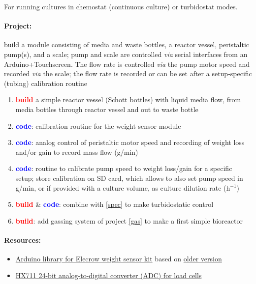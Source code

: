 \documentclass[12pt,a4paper]{scrartcl}
\newcommand{\build}[0]{\textcolor{red}{\textbf{build}}}
\newcommand{\code}[0]{\textcolor{blue}{\textbf{code}}}
\newcommand{\ph}[0]{h{\small$^{-1}$}}
\begin{document}
For running cultures in chemostat (continuous culture) or turbidostat modes. 

\paragraph{Project:} build a module consisting of media and waste bottles, 
a reactor vessel, peristaltic pump(s), and a scale; pump and scale are
controlled \textit{via} serial interfaces from an
Arduino+Touchscreen. The flow rate is controlled \textit{via} the pump
motor speed and recorded \textit{via} the scale; the flow rate is
recorded or can be set after a setup-specific (tubing) calibration
routine


\begin{enumerate}
\item \build{} a simple reactor vessel (Schott bottles) with liquid
  media flow, from media bottles through reactor vessel and out to
  waste bottle 
\item \code{}: calibration routine for the weight sensor module
\item \code{}: analog control of peristaltic motor speed and recording of
  weight loss and/or gain to record mass flow (g/min)
\item \code{}: routine to calibrate pump speed to weight loss/gain
  for a specific setup; store calibration on SD card, which allows
  to also set pump speed in g/min, or if provided with a culture
  volume, as culture dilution rate (\ph{})
\item \build{} \& \code{}: combine with \ref{spec} to make
  turbidostatic control
\item \build{}: add gassing system of project \ref{gas} to make a first
  simple bioreactor
\end{enumerate}

\paragraph{Resources:}
\begin{itemize}
\item \href{ https://github.com/bogde/HX711}{Arduino library for Elecrow weight sensor kit} based on \href{https://github.com/aguegu/ardulibs/tree/master/hx711}{older version}
\item \href{https://cdn.sparkfun.com/datasheets/Sensors/ForceFlex/hx711_english.pdf}{HX711 24-bit analog-to-digital converter (ADC) for load cells}
\end{itemize}
\end{document}
